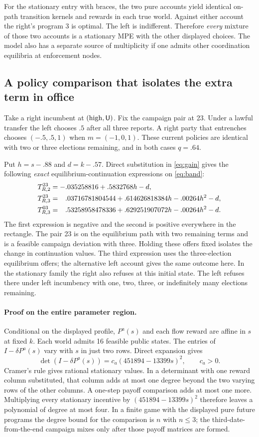 \documentclass[11pt,letterpaper]{article}
\begin{document}
For the stationary entry with braces, the two pure accounts yield identical on-path transition kernels and rewards in each true world. Against either account the right's program 3 is optimal. The left is indifferent. Therefore \emph{every} mixture of those two accounts is a stationary MPE with the other displayed choices. The model also has a separate source of multiplicity if one admits other coordination equilibria at enforcement nodes.

\newpage
\subsection*{A policy comparison that isolates the extra term in office}
Take a right incumbent at \((\mathrm{high},\mathsf U)\). Fix the campaign pair at 23. Under a lawful transfer the left chooses \(.5\) after all three reports. A right party that entrenches chooses \((-.5,.5,1)\) when \(m=(-1,0,1)\). These current policies are identical with two or three elections remaining, and in both cases \(q=.64\).

Put \(h=s-.88\) and \(d=k-.57\). Direct substitution in \eqref{eq:gain} gives the following \emph{exact} equilibrium-continuation expressions on \eqref{eq:band}:
\begin{align}
 T_{R,2}^{23}&=-.035258816+.5832768h-d,\notag\\
 T_{R,3}^{23}&=\phantom{-}.03716781804544+.614626818384h-.00264h^2-d,\label{eq:exact}\\
 T_{R,3}^{03}&=\phantom{-}.53258958478336+.629251907072h-.00264h^2-d.\notag
\end{align}
The first expression is negative and the second is positive everywhere in the rectangle. The pair 23 is on the equilibrium path with two remaining terms and is a feasible campaign deviation with three. Holding these offers fixed isolates the change in continuation values. The third expression uses the three-election equilibrium offers; the alternative left account gives the same outcome here. In the stationary family the right also refuses at this initial state. The left refuses there under left incumbency with one, two, three, or indefinitely many elections remaining.

\paragraph{Proof on the entire parameter region.}
Conditional on the displayed profile, \(P^a(s)\) and each flow reward are affine in \(s\) at fixed \(k\). Each world admits 16 feasible public states. The entries of \(I-\delta P^a(s)\) vary with \(s\) in just two rows. Direct expansion gives
\[
 \det(I-\delta P^a(s))=c_a(451894-13399s)^2,\qquad c_a>0 .
\]
Cramer's rule gives rational stationary values. In a determinant with one reward column substituted, that column adds at most one degree beyond the two varying rows of the other columns. A one-step payoff comparison adds at most one more. Multiplying every stationary incentive by \((451894-13399s)^2\) therefore leaves a polynomial of degree at most four. In a finite game with the displayed pure future programs the degree bound for the comparison is \(n\) with \(n\le3\); the third-date-from-the-end campaign mixes only after those payoff matrices are formed.
\end{document}

